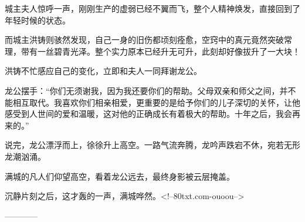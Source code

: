 \begin{this_body}
城主夫人惊呼一声，刚刚生产的虚弱已经不翼而飞，整个人精神焕发，直接回到了年轻时候的状态。

而城主洪铸则骇然发现，自己一身的旧伤都顷刻痊愈，空窍中的真元竟然突破常理，带有一丝碧青光泽。整个实力原本已经升无可升，此刻却好像拔升了一大块！

洪铸不忙感应自己的变化，立即和夫人一同拜谢龙公。

龙公摆手：“你们无须谢我，因为我还要你们的帮助。父母双亲和师父之间，并不能相互取代。我喜欢你们相亲相爱，更重要的是给予你们的儿子深切的关怀，让他感受到人世间的爱和温暖，这对他的正确成长有着极大的帮助。十年之后，我会再来的。”

说完，龙公漂浮而上，徐徐升上高空。一路气流奔腾，龙吟声跌宕不休，宛若无形龙潮汹涌。

满城的凡人们仰望高空，看着龙公远去，最终身影被云层掩盖。

沉静片刻之后，这才轰的一声，满城哗然。<!--80txt.com-ouoou-->

------------

\end{this_body}

